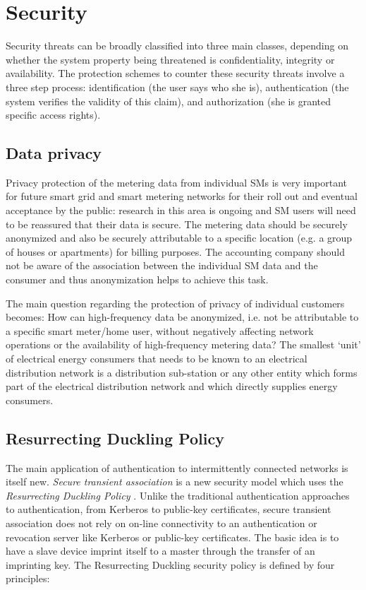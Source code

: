 \chapter{Security}

Security threats can be broadly classified into three main classes, depending on whether the system property being threatened is confidentiality, integrity or availability. The protection schemes to counter these security threats involve a three step process: identification (the user says who she is), authentication (the system verifies the validity of this claim), and authorization (she is granted specific access rights).

\section {Data privacy}

Privacy protection of the metering data from individual SMs is very important for future smart grid and smart metering networks for their roll out and eventual acceptance by the public: research in this area is ongoing and SM users will need to be reassured that their data is secure. The metering data should be securely anonymized and also be securely attributable to a specific location (e.g. a group of houses or  apartments) for billing purposes. The accounting company should not be aware of the association between the individual SM data and the consumer and thus anonymization helps to achieve this task.

The main question regarding the protection of privacy of individual customers becomes: How can high-frequency data be anonymized, i.e. not be attributable to a specific smart meter/home user, without  negatively affecting network operations or the availability of high-frequency metering data? The smallest ‘unit’ of electrical energy consumers that needs to be known to an electrical distribution network is a distribution sub-station or any other entity which forms part of the electrical distribution network and which directly supplies energy consumers.

\section {Resurrecting Duckling Policy}

The main application of authentication to intermittently connected networks is itself new. \emph{Secure transient association} is a new security model which uses the \emph{Resurrecting Duckling Policy} \cite{Sta_duck}. Unlike the traditional authentication approaches to authentication, from Kerberos to public-key certificates, secure transient association does not rely on on-line connectivity to an authentication or revocation server like Kerberos or public-key certificates. The basic idea is to have a slave device imprint itself to a master through the transfer of an imprinting key. The Resurrecting Duckling security policy is defined by four principles: 

